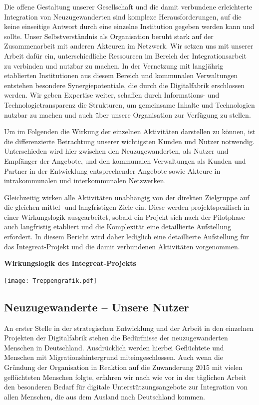 \documentclass[12pt, a4paper]{article} %
\begin{document}
Die offene Gestaltung unserer Gesellschaft und die damit verbundene
erleichterte Integration von Neuzugewanderten sind komplexe
Herausforderungen, auf die keine einseitige Antwort durch eine einzelne
Institution gegeben werden kann und sollte. Unser Selbstverständnis als
Organisation beruht stark auf der Zusammenarbeit mit anderen Akteuren im
Netzwerk. Wir setzen uns mit unserer Arbeit dafür ein, unterschiedliche
Ressourcen im Bereich der Integrationsarbeit zu verbinden und nutzbar zu
machen. In der Vernetzung mit langjährig etablierten Institutionen aus
diesem Bereich und kommunalen Verwaltungen entstehen besondere
Synergiepotentiale, die durch die Digitalfabrik erschlossen werden. Wir
geben Expertise weiter, schaffen durch Informations- und
Technologietransparenz die Strukturen, um gemeinsame Inhalte und
Technologien nutzbar zu machen und auch über unsere Organisation zur
Verfügung zu stellen.

Um im Folgenden die Wirkung der einzelnen Aktivitäten darstellen zu
können, ist die differenzierte Betrachtung unserer wichtigsten Kunden
und Nutzer notwendig. Unterschieden wird hier zwischen den
Neuzugewanderten, als Nutzer und Empfänger der Angebote, und den
kommunalen Verwaltungen als Kunden und Partner in der Entwicklung
entsprechender Angebote sowie Akteure in intrakommunalen und
interkommunalen Netzwerken.

Gleichzeitig wirken alle Aktivitäten unabhängig von der direkten
Zielgruppe auf die gleichen mittel- und langfristigen Ziele ein. Diese
werden projektspezifisch in einer Wirkungslogik ausgearbeitet, sobald
ein Projekt sich nach der Pilotphase auch langfristig etabliert und die
Komplexität eine detaillierte Aufstellung erfordert. In diesem Bericht
wird daher lediglich eine detaillierte Aufstellung für das
Integreat-Projekt und die damit verbundenen Aktivitäten vorgenommen.


\begin{minipage}[t]{\textwidth}
    \textbf{Wirkungslogik des Integreat-Projekts}

    \texttt{[image: Treppengrafik.pdf]}
\end{minipage}

\hypertarget{neuzugewanderte-unsere-nutzer}{%
\subsection{Neuzugewanderte – Unsere
Nutzer}\label{neuzugewanderte-unsere-nutzer}}

An erster Stelle in der strategischen Entwicklung und der Arbeit in den
einzelnen Projekten der Digitalfabrik stehen die Bedürfnisse der
neuzugewanderten Menschen in Deutschland. Ausdrücklich werden hierbei
Geflüchtete und Menschen mit Migrationshintergrund miteingeschlossen.
Auch wenn die Gründung der Organisation in Reaktion auf die Zuwanderung
2015 mit vielen geflüchteten Menschen folgte, erfahren wir nach wie vor
in der täglichen Arbeit den besonderen Bedarf für digitale
Unterstützungsangebote zur Integration von allen Menschen, die aus dem
Ausland nach Deutschland kommen.
\end{document}
